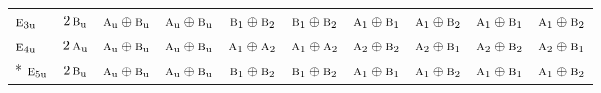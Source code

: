 \documentclass[10pt,a4paper]{article}
\numberwithin{equation}{section}
\newcommand{\irr}[1]{\text{\normalfont\scshape #1}}
\newcommand{\ptag}[1]{\mathrm{#1}}
\begin{document}
{\begin{longtable}{@{}lccccccccc@{}}
$\irr{e}_{3\ptag{u}}$ & $2\,\irr{b}_{\ptag{u}}$ & $\irr{a}_{\ptag{u}}\oplus \irr{b}_{\ptag{u}}$ & $\irr{a}_{\ptag{u}}\oplus \irr{b}_{\ptag{u}}$ & $\irr{b}_{1}\oplus \irr{b}_{2}$ & $\irr{b}_{1}\oplus \irr{b}_{2}$ & $\irr{a}_{1}\oplus \irr{b}_{1}$ & $\irr{a}_{1}\oplus \irr{b}_{2}$ & $\irr{a}_{1}\oplus \irr{b}_{1}$ & $\irr{a}_{1}\oplus \irr{b}_{2}$\\
$\irr{e}_{4\ptag{u}}$ & $2\,\irr{a}_{\ptag{u}}$ & $\irr{a}_{\ptag{u}}\oplus \irr{b}_{\ptag{u}}$ & $\irr{a}_{\ptag{u}}\oplus \irr{b}_{\ptag{u}}$ & $\irr{a}_{1}\oplus \irr{a}_{2}$ & $\irr{a}_{1}\oplus \irr{a}_{2}$ & $\irr{a}_{2}\oplus \irr{b}_{2}$ & $\irr{a}_{2}\oplus \irr{b}_{1}$ & $\irr{a}_{2}\oplus \irr{b}_{2}$ & $\irr{a}_{2}\oplus \irr{b}_{1}$\\*
$\irr{e}_{5\ptag{u}}$ & $2\,\irr{b}_{\ptag{u}}$ & $\irr{a}_{\ptag{u}}\oplus \irr{b}_{\ptag{u}}$ & $\irr{a}_{\ptag{u}}\oplus \irr{b}_{\ptag{u}}$ & $\irr{b}_{1}\oplus \irr{b}_{2}$ & $\irr{b}_{1}\oplus \irr{b}_{2}$ & $\irr{a}_{1}\oplus \irr{b}_{1}$ & $\irr{a}_{1}\oplus \irr{b}_{2}$ & $\irr{a}_{1}\oplus \irr{b}_{1}$ & $\irr{a}_{1}\oplus \irr{b}_{2}$\\
\bottomrule\end{longtable}}
\end{document}

